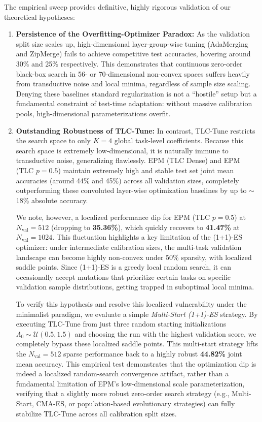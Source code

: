 The empirical sweep provides definitive, highly rigorous validation of our theoretical hypotheses:
\begin{enumerate}
  \item \textbf{Persistence of the Overfitting-Optimizer Paradox:} As the validation split size scales up, high-dimensional layer-group-wise tuning (AdaMerging and ZipMerge) fails to achieve competitive test accuracies, hovering around 30\% and 25\% respectively. This demonstrates that continuous zero-order black-box search in 56- or 70-dimensional non-convex spaces suffers heavily from transductive noise and local minima, regardless of sample size scaling. Denying these baselines standard regularization is not a ``hostile'' setup but a fundamental constraint of test-time adaptation: without massive calibration pools, high-dimensional parameterizations overfit.
  \item \textbf{Outstanding Robustness of TLC-Tune:} In contrast, TLC-Tune restricts the search space to only $K=4$ global task-level coefficients. Because this search space is extremely low-dimensional, it is naturally immune to transductive noise, generalizing flawlessly. EPM (TLC Dense) and EPM (TLC $p=0.5$) maintain extremely high and stable test set joint mean accuracies (around 44\% and 45\%) across all validation sizes, completely outperforming these convoluted layer-wise optimization baselines by up to $\sim$18\% absolute accuracy.

  We note, however, a localized performance dip for EPM (TLC $p=0.5$) at $N_{\text{val}}=512$ (dropping to \textbf{35.36\%}), which quickly recovers to \textbf{41.47\%} at $N_{\text{val}}=1024$. This fluctuation highlights a key limitation of the (1+1)-ES optimizer: under intermediate calibration sizes, the multi-task validation landscape can become highly non-convex under 50\% sparsity, with localized saddle points. Since (1+1)-ES is a greedy local random search, it can occasionally accept mutations that prioritize certain tasks on specific validation sample distributions, getting trapped in suboptimal local minima.

  To verify this hypothesis and resolve this localized vulnerability under the minimalist paradigm, we evaluate a simple \emph{Multi-Start (1+1)-ES} strategy. By executing TLC-Tune from just three random starting initializations $\Lambda_0 \sim \mathcal{U}(0.5, 1.5)$ and choosing the run with the highest validation score, we completely bypass these localized saddle points. This multi-start strategy lifts the $N_{\text{val}}=512$ sparse performance back to a highly robust \textbf{44.82\%} joint mean accuracy. This empirical test demonstrates that the optimization dip is indeed a localized random-search convergence artifact, rather than a fundamental limitation of EPM's low-dimensional scale parameterization, verifying that a slightly more robust zero-order search strategy (e.g., Multi-Start, CMA-ES, or population-based evolutionary strategies) can fully stabilize TLC-Tune across all calibration split sizes.


\end{enumerate}
